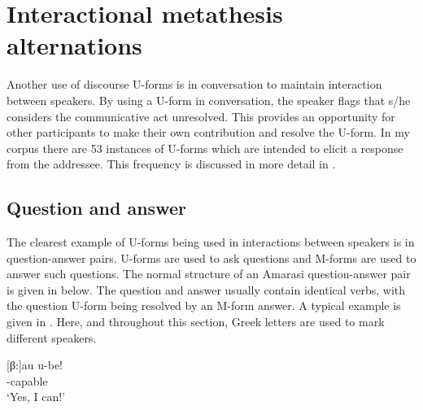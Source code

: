 \section{Interactional metathesis alternations}\label{sec:IntUnm}
Another use of discourse U-forms is in conversation
to maintain interaction between speakers.
By using a U-form in conversation, the speaker flags
that s/he considers the communicative act unresolved.
This provides an opportunity for other participants
to make their own contribution and resolve the U-form.
In my corpus there are 53 instances of U-forms
which are intended to elicit a response from the addressee.
This frequency is discussed in more detail in .

\subsection{Question and answer}\label{sec:Q/A}
The clearest example of U-forms being used in
interactions between speakers is in question-answer pairs.
U-forms are used to ask questions and M-forms
are used to answer such questions.
The normal structure of an Amarasi question-answer pair is given in  below.
The question and answer usually contain identical verbs,
with the question U-form being resolved by an M-form answer.
A typical example is given in .
Here, and throughout this section, Greek letters
are used to mark different speakers.

\begin{exe}
	\label{ex:Q/A}
\end{exe}

\begin{multicols}{2}
	\begin{exe}
		\label{ex:02/08/13, p.20}
			\begin{xlist}
			\end{xlist}
		\sn{ \txrf{observation 02/08/13, p.20}}
			\begin{xlist}
				[β:]{\gll	au u-be\tbr{iʔ}!\\
									{\au} \qu-capable{\tbrM}\\
						\glt	`Yes, I can!'}
			\end{xlist}
	\end{exe}
\end{multicols}

